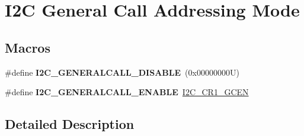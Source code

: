 \hypertarget{group___i2_c___g_e_n_e_r_a_l___c_a_l_l___a_d_d_r_e_s_s_i_n_g___m_o_d_e}{}\section{I2C General Call Addressing Mode}
\label{group___i2_c___g_e_n_e_r_a_l___c_a_l_l___a_d_d_r_e_s_s_i_n_g___m_o_d_e}
\subsection*{Macros}
\begin{DoxyCompactItemize}
\item 
\mbox{\label{group___i2_c___g_e_n_e_r_a_l___c_a_l_l___a_d_d_r_e_s_s_i_n_g___m_o_d_e_ga14918ea7d2b23cd67c66b49ebbf5c0a8}} 
\#define {\bfseries I2\+C\+\_\+\+G\+E\+N\+E\+R\+A\+L\+C\+A\+L\+L\+\_\+\+D\+I\+S\+A\+B\+LE}~(0x00000000\+U)
\item 
\mbox{\label{group___i2_c___g_e_n_e_r_a_l___c_a_l_l___a_d_d_r_e_s_s_i_n_g___m_o_d_e_ga5ec9ec869e4c78a597c5007c245c01a0}} 
\#define {\bfseries I2\+C\+\_\+\+G\+E\+N\+E\+R\+A\+L\+C\+A\+L\+L\+\_\+\+E\+N\+A\+B\+LE}~\mbox{\hyperlink{group___peripheral___registers___bits___definition_gac28d4f433e501e727c91097dccc4616c}{I2\+C\+\_\+\+C\+R1\+\_\+\+G\+C\+EN}}
\end{DoxyCompactItemize}


\subsection{Detailed Description}
